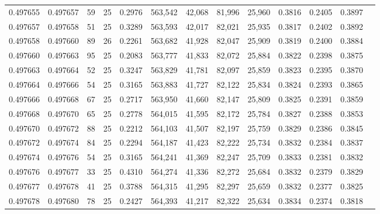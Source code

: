 \begin{tabular}{rrrrrrrrrrrrr}
0.497655 & 0.497657 &    59 &  25 &                                     0.2976 & 563,542 &  42,068 &  81,996 &  25,960 & 0.3816 & 0.2405 & 0.3897 \\
0.497657 & 0.497658 &    51 &  25 &                                     0.3289 & 563,593 &  42,017 &  82,021 &  25,935 & 0.3817 & 0.2402 & 0.3892 \\
0.497658 & 0.497660 &    89 &  26 &                                     0.2261 & 563,682 &  41,928 &  82,047 &  25,909 & 0.3819 & 0.2400 & 0.3884 \\
0.497660 & 0.497663 &    95 &  25 &                                     0.2083 & 563,777 &  41,833 &  82,072 &  25,884 & 0.3822 & 0.2398 & 0.3875 \\
0.497663 & 0.497664 &    52 &  25 &                                     0.3247 & 563,829 &  41,781 &  82,097 &  25,859 & 0.3823 & 0.2395 & 0.3870 \\
0.497664 & 0.497666 &    54 &  25 &                                     0.3165 & 563,883 &  41,727 &  82,122 &  25,834 & 0.3824 & 0.2393 & 0.3865 \\
0.497666 & 0.497668 &    67 &  25 &                                     0.2717 & 563,950 &  41,660 &  82,147 &  25,809 & 0.3825 & 0.2391 & 0.3859 \\
0.497668 & 0.497670 &    65 &  25 &                                     0.2778 & 564,015 &  41,595 &  82,172 &  25,784 & 0.3827 & 0.2388 & 0.3853 \\
0.497670 & 0.497672 &    88 &  25 &                                     0.2212 & 564,103 &  41,507 &  82,197 &  25,759 & 0.3829 & 0.2386 & 0.3845 \\
0.497672 & 0.497674 &    84 &  25 &                                     0.2294 & 564,187 &  41,423 &  82,222 &  25,734 & 0.3832 & 0.2384 & 0.3837 \\
0.497674 & 0.497676 &    54 &  25 &                                     0.3165 & 564,241 &  41,369 &  82,247 &  25,709 & 0.3833 & 0.2381 & 0.3832 \\
0.497676 & 0.497677 &    33 &  25 &                                     0.4310 & 564,274 &  41,336 &  82,272 &  25,684 & 0.3832 & 0.2379 & 0.3829 \\
0.497677 & 0.497678 &    41 &  25 &                                     0.3788 & 564,315 &  41,295 &  82,297 &  25,659 & 0.3832 & 0.2377 & 0.3825 \\
0.497678 & 0.497680 &    78 &  25 &                                     0.2427 & 564,393 &  41,217 &  82,322 &  25,634 & 0.3834 & 0.2374 & 0.3818 \\

\end{tabular}
